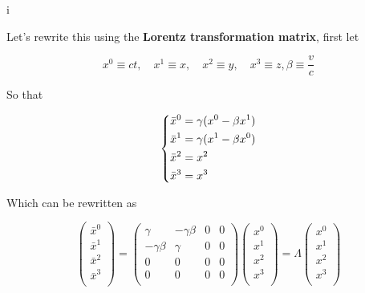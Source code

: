 i\documentclass[a4paper]{article}
\begin{document}
Let's rewrite this using the \textbf{Lorentz transformation matrix}, first let

\begin{equation*}
    x^0\equiv ct,\quad x^1\equiv x,\quad x^2\equiv y,\quad x^3\equiv z, \beta\equiv\frac{v}{c}
\end{equation*}

So that

\begin{equation*}
    \begin{dcases}
        \bar{x}^0 = \gamma(x^0-\beta x^1) \\
        \bar{x}^1 = \gamma(x^1-\beta x^0) \\
        \bar{x}^2 = x^2 \\
        \bar{x}^3 = x^3 \\
    \end{dcases}
\end{equation*}

Which can be rewritten as

\begin{equation*}
    \begin{pmatrix}
        \bar{x}^0 \\
        \bar{x}^1 \\
        \bar{x}^2 \\
        \bar{x}^3 \\
    \end{pmatrix}
    =
    \begin{pmatrix}
        \gamma & -\gamma\beta & 0 & 0 \\
        -\gamma\beta & \gamma & 0 & 0 \\
        0 & 0 & 0 & 0 \\
        0 & 0 & 0 & 0 \\
    \end{pmatrix}
    \begin{pmatrix}
        x^0 \\
        x^1 \\
        x^2 \\
        x^3 \\
    \end{pmatrix}
    =
    \Lambda    
    \begin{pmatrix}
        x^0 \\
        x^1 \\
        x^2 \\
        x^3 \\
    \end{pmatrix}
\end{equation*}
\end{document}
